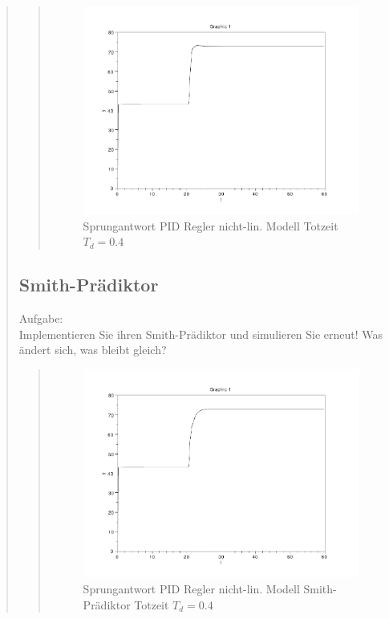 \begin{quote}
    \begin{quote}
        \begin{figure}[H]
        \centering
            \includegraphics[scale=0.7, trim = 0cm 0cm 0cm 0cm, clip]{./Bilder/4_2_Td_04}
                \caption{Sprungantwort PID Regler nicht-lin. Modell Totzeit $T_d = 0.4$}
        \end{figure}
    
    \end{quote}
    
    
    \subsection{Smith-Prädiktor}
    Aufgabe:\\
    Implementieren Sie ihren Smith-Prädiktor und simulieren Sie erneut! Was ändert sich, was bleibt gleich?\vspace{1em}
    
    \begin{quote}
        \begin{figure}[H]
        \centering
            \includegraphics[scale=0.7, trim = 0cm 0cm 0cm 0cm, clip]{./Bilder/4_3_Td_04}
               \caption{Sprungantwort PID Regler nicht-lin. Modell Smith-Prädiktor Totzeit $T_d = 0.4$}
        \end{figure}
    

\end{quote}
\end{quote}
